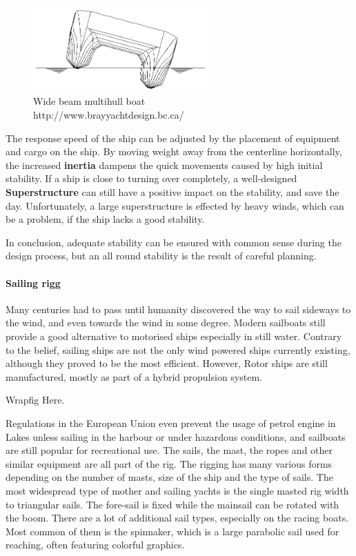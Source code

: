 \begin{figure}[H]
	\centering
	\includegraphics[width=0.6\textwidth]{img3/stability3}
	\caption{Wide beam multihull boat\\http://www.brayyachtdesign.bc.ca/}
	\label{fig:stability3}
\end{figure}

The response speed of the ship can be adjusted by the placement of equipment and cargo on the ship. By moving weight away from the centerline horizontally, the increased \textbf{inertia} dampens the quick movements caused by high initial stability. If a ship is close to turning over completely, a well-designed \textbf{Superstructure} can still have a positive impact on the stability, and save the day. Unfortunately, a large superstructure is effected by heavy winds, which can be a problem, if the ship lacks a good stability.

In conclusion, adequate stability can be ensured with common sense during the design process, but an all round stability is the result of careful planning.

\paragraph{Sailing rigg} 

Many centuries had to pass until humanity discovered the way to sail sideways to the wind, and even towards the wind in some degree. Modern sailboats still provide a good alternative to motorised ships especially in still water. Contrary to the belief, sailing ships are not the only wind powered ships currently existing, although they proved to be the most efficient. However, Rotor ships are still manufactured, mostly as part of a hybrid propulsion system.

Wrapfig Here.

Regulations in the European Union even prevent the usage of petrol engine in Lakes unless sailing in the harbour or under hazardous conditions, and sailboats are still popular for recreational use. The sails, the mast, the ropes and other similar equipment are all part of the rig. The rigging has many various forms depending on the number of masts, size of the ship and the type of sails. The most widespread type of mother and sailing yachts is the single masted rig width to triangular sails. The fore-sail  is fixed while the mainsail can be rotated with the boom. There are a lot of additional sail types, especially on the racing boats. Most common of them is the spinnaker, which is a large parabolic sail used for reaching, often featuring colorful graphics.

